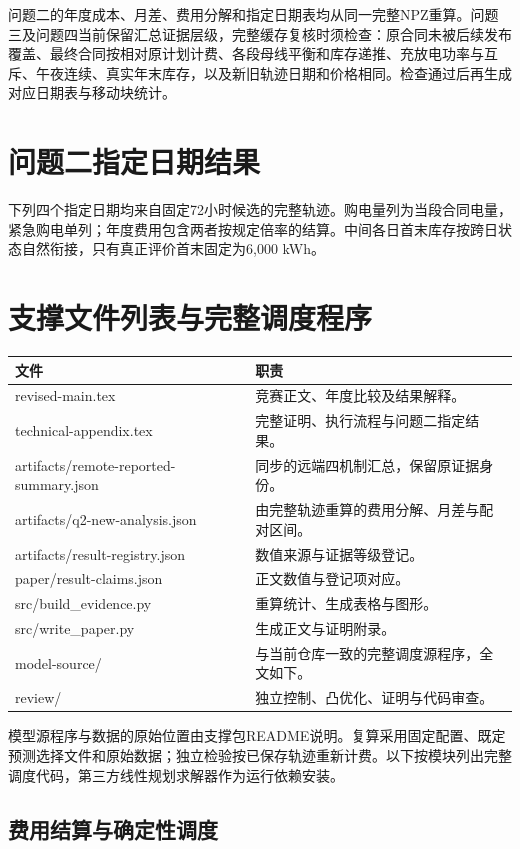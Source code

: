 问题二的年度成本、月差、费用分解和指定日期表均从同一完整NPZ重算。问题三及问题四当前保留汇总证据层级，完整缓存复核时须检查：原合同未被后续发布覆盖、最终合同按相对原计划计费、各段母线平衡和库存递推、充放电功率与互斥、午夜连续、真实年末库存，以及新旧轨迹日期和价格相同。检查通过后再生成对应日期表与移动块统计。

\clearpage
\section{问题二指定日期结果}
下列四个指定日期均来自固定72小时候选的完整轨迹。购电量列为当段合同电量，紧急购电单列；年度费用包含两者按规定倍率的结算。中间各日首末库存按跨日状态自然衔接，只有真正评价首末固定为6,000 kWh。


\clearpage
\section{支撑文件列表与完整调度程序}
\begin{longtable}{p{5.5cm}p{9cm}}\toprule
文件&职责\\\midrule\endhead
revised-main.tex&竞赛正文、年度比较及结果解释。\\
technical-appendix.tex&完整证明、执行流程与问题二指定结果。\\
artifacts/remote-reported-summary.json&同步的远端四机制汇总，保留原证据身份。\\
artifacts/q2-new-analysis.json&由完整轨迹重算的费用分解、月差与配对区间。\\
artifacts/result-registry.json&数值来源与证据等级登记。\\
paper/result-claims.json&正文数值与登记项对应。\\
src/build\_evidence.py&重算统计、生成表格与图形。\\
src/write\_paper.py&生成正文与证明附录。\\
model-source/&与当前仓库一致的完整调度源程序，全文如下。\\
review/&独立控制、凸优化、证明与代码审查。\\\bottomrule
\end{longtable}
模型源程序与数据的原始位置由支撑包README说明。复算采用固定配置、既定预测选择文件和原始数据；独立检验按已保存轨迹重新计费。以下按模块列出完整调度代码，第三方线性规划求解器作为运行依赖安装。

\clearpage\subsection{费用结算与确定性调度}

